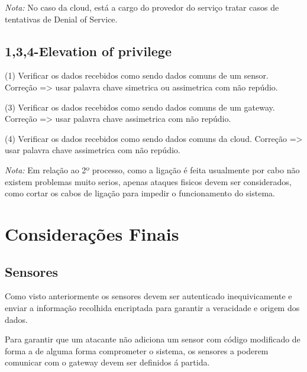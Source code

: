 \textit{Nota:} No caso da cloud, está a cargo do provedor do serviço tratar casos de tentativas de Denial of Service.\newline

\subsection{1,3,4-Elevation of privilege}
\par\hfill
\par (1) Verificar os dados recebidos como sendo dados comuns de um sensor.\newline
Correção => usar palavra chave simetrica ou assimetrica com não repúdio.\newline

\par (3) Verificar os dados recebidos como sendo dados comuns de um gateway.\newline
Correção => usar palavra chave assimetrica com não repúdio. \newline

\par (4) Verificar os dados recebidos como sendo dados comuns da cloud.\newline
Correção => usar palavra chave assimetrica com não repúdio. \newline



\textit{Nota:} Em relação ao 2º processo, como a ligação é feita usualmente por cabo não existem problemas muito serios, apenas ataques fisicos devem ser considerados, como cortar os cabos de ligação para impedir o funcionamento do sistema.\newline


\section{Considerações Finais}

\subsection{Sensores}
\par\hfill
\par Como visto anteriormente os sensores devem ser autenticado inequivicamente e enviar a informação recolhida encriptada para garantir a veracidade e origem dos dados.\newline
\par Para garantir que um atacante não adiciona um sensor com código modificado de forma a de alguma forma comprometer o sistema, os sensores a poderem comunicar com o gateway devem ser definidos á partida.\newline


